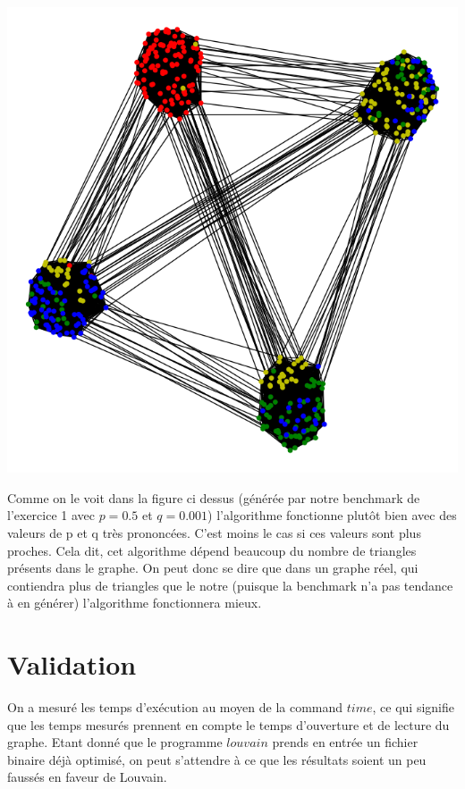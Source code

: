 \documentclass{report}
\begin{document}
\begin{center}
  \includegraphics[width=0.6\paperwidth]{assets/exo4.png}
\end{center}

Comme on le voit dans la figure ci dessus (générée par notre benchmark de l'exercice 1 avec $p = 0.5$ et $q = 0.001$) l'algorithme fonctionne plutôt bien avec des valeurs de p et q très prononcées. C'est moins le cas si ces valeurs sont plus proches. Cela dit, cet algorithme dépend beaucoup du nombre de triangles présents dans le graphe. On peut donc se dire que dans un graphe réel, qui contiendra plus de triangles que le notre (puisque la benchmark n'a pas tendance à en générer) l'algorithme fonctionnera mieux.

\section{Validation}

On a mesuré les temps d'exécution au moyen de la command $time$, ce qui signifie que les temps mesurés prennent en compte le temps d'ouverture et de lecture du graphe. Etant donné que le programme $louvain$ prends en entrée un fichier binaire déjà optimisé, on peut s'attendre à ce que les résultats soient un peu faussés en faveur de Louvain.
\end{document}
